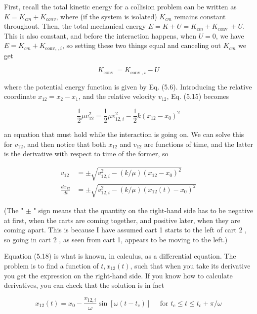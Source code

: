 \documentclass[10pt]{article}
\begin{document}
First, recall the total kinetic energy for a collision problem can be written as $K=K_{c m}+K_{c o n v}$, where (if the system is isolated) $K_{c m}$ remains constant throughout. Then, the total mechanical energy $E=K+U=K_{c m}+K_{\text {conv }}+U$. This is also constant, and before the interaction happens, when $U=0$, we have $E=K_{c m}+K_{\text {conv, }, i}$, so setting these two things equal and canceling out $K_{c m}$ we get


\begin{equation*}
K_{\text {conv }}=K_{\text {conv }, i}-U \tag{5.15}
\end{equation*}


where the potential energy function is given by Eq. (5.6). Introducing the relative coordinate $x_{12}=x_{2}-x_{1}$, and the relative velocity $v_{12}$, Eq. (5.15) becomes


\begin{equation*}
\frac{1}{2} \mu v_{12}^{2}=\frac{1}{2} \mu v_{12, i}^{2}-\frac{1}{2} k\left(x_{12}-x_{0}\right)^{2} \tag{5.16}
\end{equation*}


an equation that must hold while the interaction is going on. We can solve this for $v_{12}$, and then notice that both $x_{12}$ and $v_{12}$ are functions of time, and the latter is the derivative with respect to time of the former, so


\begin{align*}
v_{12} & = \pm \sqrt{v_{12, i}^{2}-(k / \mu)\left(x_{12}-x_{0}\right)^{2}}  \tag{5.17}\\
\frac{d x_{12}}{d t} & = \pm \sqrt{v_{12, i}^{2}-(k / \mu)\left(x_{12}(t)-x_{0}\right)^{2}} \tag{5.18}
\end{align*}


(The " $\pm$ " sign means that the quantity on the right-hand side has to be negative at first, when the carts are coming together, and positive later, when they are coming apart. This is because I have assumed cart 1 starts to the left of cart 2 , so going in cart 2 , as seen from cart 1, appears to be moving to the left.)

Equation (5.18) is what is known, in calculus, as a differential equation. The problem is to find a function of $t, x_{12}(t)$, such that when you take its derivative you get the expression on the right-hand side. If you know how to calculate derivatives, you can check that the solution is in fact


\begin{equation*}
x_{12}(t)=x_{0}-\frac{v_{12, i}}{\omega} \sin \left[\omega\left(t-t_{c}\right)\right] \quad \text { for } t_{c} \leq t \leq t_{c}+\pi / \omega \tag{5.19}
\end{equation*}
\end{document}

